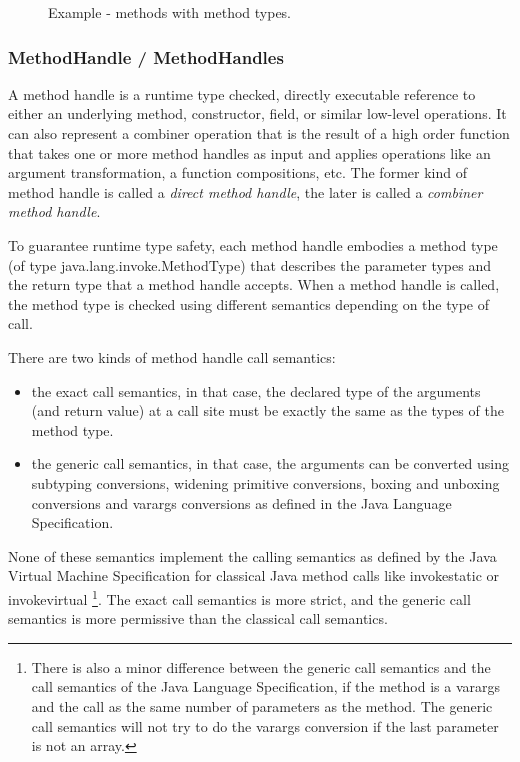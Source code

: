 \documentclass{sig-alternate}
\begin{document}
      \begin{figure}[!h]
        \centering \vspace{-1.5em}
        \caption{Example - methods with method types.}\vspace{-1em}
        \label{fooMTS}
      \end{figure}

    \subsubsection{MethodHandle / MethodHandles}
      \label{MH}

      A method handle is a runtime type checked, directly executable reference to
      either an underlying method, constructor, field, or similar low-level operations.
      It can also represent a combiner operation that is the result of a high order function
      that takes one or more method handles as input and applies operations like an argument transformation,
      a function compositions, etc.
      The former kind of method handle is called a {\it direct method handle},
      the later is called a {\it combiner method handle}.

      To guarantee runtime type safety, each method handle embodies a method type (of type java.lang.invoke.MethodType)
      that describes the parameter types and the return type that a method handle accepts.
      When a method handle is called, the method type is checked using different semantics depending on the
      type of call.

      There are two kinds of method handle call semantics:
      \begin{itemize}
        \item the exact call semantics, in that case, the declared type of the arguments (and return value) at a call site
              must be exactly the same as the types of the method type.
        \item the generic call semantics, in that case, the arguments can be converted using subtyping conversions,
              widening primitive conversions, boxing and unboxing conversions and varargs conversions
              as defined in the Java Language Specification.
      \end{itemize}
      None of these semantics implement the calling semantics as defined by the Java Virtual Machine Specification
      for classical Java method calls like invokestatic or invokevirtual
      \footnote{There is also a minor difference between the generic call semantics and the call semantics of
        the Java Language Specification, if the method is a varargs and the call as the same number of parameters as the method.
        The generic call semantics will not try to do the varargs conversion if the last parameter is not an array.}.
      The exact call semantics is more strict, and the generic call semantics is more permissive than the classical call semantics.
\end{document}
